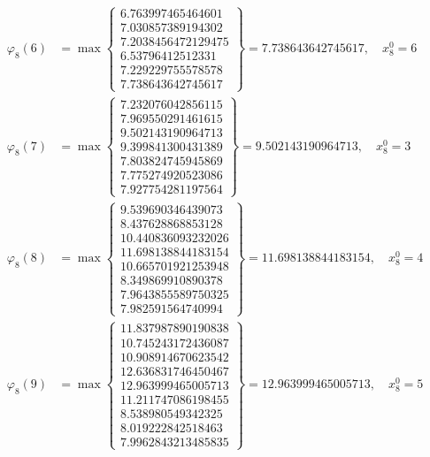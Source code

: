 \documentclass{article}
\begin{document}
\begin{align*}
  
\varphi_{8}(6) &= \max \left\{ \begin{array}{c}
6.763997465464601 \\
 7.030857389194302 \\
 7.2038456472129475 \\
 6.53796412512331 \\
 7.229229755578578 \\
 7.738643642745617
\end{array} \right\} = 7.738643642745617, \quad x_{8}^0 = 6\\
  
  
  
  
\varphi_{8}(7) &= \max \left\{ \begin{array}{c}
7.232076042856115 \\
 7.969550291461615 \\
 9.502143190964713 \\
 9.399841300431389 \\
 7.803824745945869 \\
 7.775274920523086 \\
 7.927754281197564
\end{array} \right\} = 9.502143190964713, \quad x_{8}^0 = 3\\
  
  
  
  
\varphi_{8}(8) &= \max \left\{ \begin{array}{c}
9.539690346439073 \\
 8.437628868853128 \\
 10.440836093232026 \\
 11.698138844183154 \\
 10.665701921253948 \\
 8.349869910890378 \\
 7.9643855589750325 \\
 7.982591564740994
\end{array} \right\} = 11.698138844183154, \quad x_{8}^0 = 4\\
  
  
  
  
\varphi_{8}(9) &= \max \left\{ \begin{array}{c}
11.837987890190838 \\
 10.745243172436087 \\
 10.908914670623542 \\
 12.636831746450467 \\
 12.963999465005713 \\
 11.211747086198455 \\
 8.538980549342325 \\
 8.019222842518463 \\
 7.9962843213485835
\end{array} \right\} = 12.963999465005713, \quad x_{8}^0 = 5\\
  

\end{align*}
\end{document}
